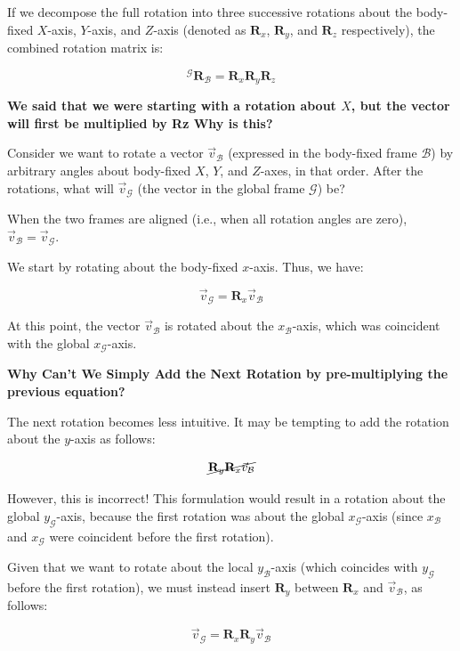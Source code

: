 \documentclass{article}
\begin{document}
If we decompose the full rotation into three successive rotations about the body-fixed \( X \)-axis, \( Y \)-axis, and \( Z \)-axis (denoted as \( \mathbf{R}_x \), \( \mathbf{R}_y \), and \( \mathbf{R}_z \) respectively), the combined rotation matrix is:

\[
{}^{\mathcal{G}} \mathbf{R}_{\mathcal{B}} = \mathbf{R}_x \mathbf{R}_y \mathbf{R}_z
\]

\textbf{We said that we were starting with a rotation about \(X \), but the vector will first be multiplied by Rz Why is this?}


Consider we want to rotate a vector \( \vec{v}_{\mathcal{B}} \) (expressed in the body-fixed frame \( \mathcal{B} \)) by arbitrary angles about body-fixed \( X \), \( Y \), and \( Z \)-axes, in that order. After the rotations, what will \( \vec{v}_{\mathcal{G}} \) (the vector in the global frame \( \mathcal{G} \)) be?

When the two frames are aligned (i.e., when all rotation angles are zero), \( \vec{v}_{\mathcal{B}} = \vec{v}_{\mathcal{G}} \).

We start by rotating about the body-fixed \( x \)-axis. Thus, we have:

\[
\vec{v}_{\mathcal{G}} = \mathbf{R}_x \vec{v}_{\mathcal{B}}
\]

At this point, the vector \( \vec{v}_{\mathcal{B}} \) is rotated about the \( x_{\mathcal{B}} \)-axis, which was coincident with the global \( x_{\mathcal{G}} \)-axis.

\textbf{Why Can't We Simply Add the Next Rotation by pre-multiplying the previous equation?}

The next rotation becomes less intuitive. It may be tempting to add the rotation about the \( y \)-axis as follows:

\[
    \cancel{\mathbf{R}_y \mathbf{R}_x \vec{v}_{\mathcal{B}}}
\]

However, this is incorrect! This formulation would result in a rotation about the global \( y_{\mathcal{G}} \)-axis, because the first rotation was about the global \( x_{\mathcal{G}} \)-axis (since \( x_{\mathcal{B}} \) and \( x_{\mathcal{G}} \) were coincident before the first rotation).

Given that we want to rotate about the local \( y_{\mathcal{B}} \)-axis (which coincides with \( y_{\mathcal{G}} \) before the first rotation), we must instead insert \( \mathbf{R}_y \) between \( \mathbf{R}_x \) and \( \vec{v}_{\mathcal{B}} \), as follows:

\[
\vec{v}_{\mathcal{G}} = \mathbf{R}_x \mathbf{R}_y \vec{v}_{\mathcal{B}}
\]
\end{document}
